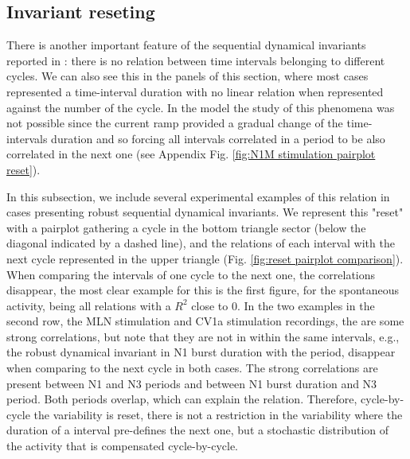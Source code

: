\subsection{Invariant reseting}
There is another important feature of the sequential dynamical invariants reported in \textcite{elices_robust_2019}: there is no relation between time intervals belonging to different cycles. We can also see this in the panels of this section, where most cases represented a time-interval duration with no linear relation when represented against the number of the cycle. In the model the study of this phenomena was not possible since the current ramp provided a gradual change of the time-intervals duration and so forcing all intervals correlated in a period to be also correlated in the next one (see Appendix Fig. \ref{fig:N1M stimulation pairplot reset}). 

In this subsection, we include several experimental examples of this relation in cases presenting robust sequential dynamical invariants. We represent this "reset" with a pairplot gathering a cycle in the bottom triangle sector (below the diagonal indicated by a dashed line), and the relations of each interval with the next cycle represented in the upper triangle (Fig. \ref{fig:reset pairplot comparison}). When comparing the intervals of one cycle to the next one, the correlations disappear, the most clear example for this is the first figure, for the spontaneous activity, being all relations with a $R^2$ close to 0. In the two examples in the second row, the MLN stimulation and CV1a stimulation recordings, the are some strong correlations, but note that they are not in within the same intervals, e.g., the robust dynamical invariant in N1 burst duration with the period, disappear when comparing to the next cycle in both cases. The strong correlations are present between N1 and N3 periods and between N1 burst duration and N3 period. Both periods overlap, which can explain the relation. Therefore, cycle-by-cycle the variability is reset, there is not a restriction in the variability where the duration of a interval pre-defines the next one, but a stochastic distribution of the activity that is compensated cycle-by-cycle. 

